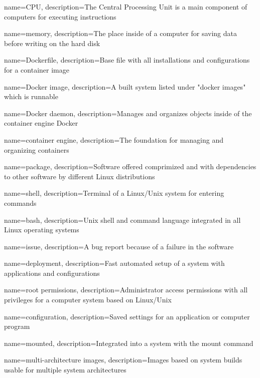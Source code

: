 {
    name={CPU},
    description={The Central Processing Unit is a main component of computers for executing instructions}
}

{
    name={memory},
    description={The place inside of a computer for saving data before writing on the hard disk}
}


{
    name={Dockerfile},
    description={Base file with all installations and configurations for a container image}
}

{
    name={Docker image},
    description={A built system listed under "docker images" which is runnable}
}

{
    name={Docker daemon},
    description={Manages and organizes objects inside of the container engine Docker}
}

{
    name={container engine},
    description={The foundation for managing and organizing containers}
}

{
    name={package},
    description={Software offered comprimized and with dependencies to other software by different Linux distributions}
}

{
    name={shell},
    description={Terminal of a Linux/Unix system for entering commands}
}

{
    name={bash},
    description={Unix shell and command language integrated in all Linux operating systems}
}

{
    name={issue},
    description={A bug report because of a failure in the software}
}

{
    name={deployment},
    description={Fast automated setup of a system with applications and configurations}
}

{
    name={root permissions},
    description={Administrator access permissions with all privileges for a computer system based on Linux/Unix}
}

{
    name={configuration},
    description={Saved settings for an application or computer program}
}

{
    name={mounted},
    description={Integrated into a system with the mount command}
}

{
    name={multi-architecture images},
    description={Images based on system builds usable for multiple system architectures}
}

